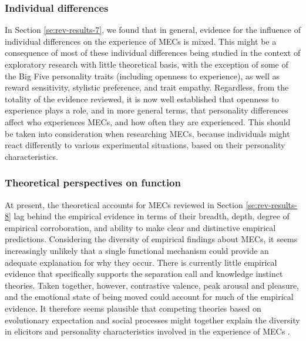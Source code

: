 \subsubsection{Individual differences}

In Section \ref{se:rev-results-7}, we found that in general, evidence for the influence of individual differences on the experience of MECs is mixed. This might be a consequence of most of these individual differences being studied in the context of exploratory research with little theoretical basis, with the exception of some of the Big Five personality traits (including openness to experience), as well as reward sensitivity, stylistic preference, and trait empathy. Regardless, from the totality of the evidence reviewed, it is now well established that openness to experience plays a role, and in more general terms, that personality differences affect who experiences MECs, and how often they are experienced. This should be taken into consideration when researching MECs, because individuals might react differently to various experimental situations, based on their personality characteristics.

\subsubsection{Theoretical perspectives on function}

At present, the theoretical accounts for MECs reviewed in Section \ref{se:rev-results-8} lag behind the empirical evidence in terms of their breadth, depth, degree of empirical corroboration, and ability to make clear and distinctive empirical predictions. Considering the diversity of empirical findings about MECs, it seems increasingly unlikely that a single functional mechanism could provide an adequate explanation for why they occur. There is currently little empirical evidence that specifically supports the separation call and knowledge instinct theories. Taken together, however, contrastive valence, peak arousal and pleasure, and the emotional state of being moved could account for much of the empirical evidence. It therefore seems plausible that competing theories based on evolutionary expectation and social processes might together explain the diversity in elicitors and personality characteristics involved in the experience of MECs \parencite[see][]{bannister2019}.

